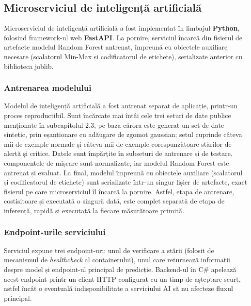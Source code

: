 \documentclass[12pt,a4paper]{article}
\begin{document}

\subsection{Microserviciul de inteligență artificială}

Microserviciul de inteligență artificială a fost implementat în limbajul \textbf{Python}, folosind framework-ul web \textbf{FastAPI}. La pornire, serviciul încarcă din fișierul de artefacte modelul Random Forest antrenat, împreună cu obiectele auxiliare necesare (scalatorul Min-Max și codificatorul de etichete), serializate anterior cu biblioteca joblib.

\subsubsection{Antrenarea modelului}

Modelul de inteligență artificială a fost antrenat separat de aplicație, printr-un proces reproductibil. Sunt încărcate mai întâi cele trei seturi de date publice menționate în subcapitolul 2.3, pe baza cărora este generat un set de date sintetic, prin eșantionare cu adăugare de zgomot gaussian; setul cuprinde câteva mii de exemple normale și câteva mii de exemple corespunzătoare stărilor de alertă și critice. Datele sunt împărțite în subseturi de antrenare și de testare, componentele de mișcare sunt normalizate, iar modelul Random Forest este antrenat și evaluat. La final, modelul împreună cu obiectele auxiliare (scalatorul și codificatorul de etichete) sunt serializate într-un singur fișier de artefacte, exact fișierul pe care microserviciul îl încarcă la pornire. Astfel, etapa de antrenare, costisitoare și executată o singură dată, este complet separată de etapa de inferență, rapidă și executată la fiecare măsurătoare primită.

\subsubsection{Endpoint-urile serviciului}

Serviciul expune trei endpoint-uri: unul de verificare a stării (folosit de mecanismul de \textit{healthcheck} al containerului), unul care returnează informații despre model și endpoint-ul principal de predicție. Backend-ul în C\# apelează acest endpoint printr-un client HTTP configurat cu un timp de așteptare scurt, astfel încât o eventuală indisponibilitate a serviciului AI să nu afecteze fluxul principal.
\end{document}
